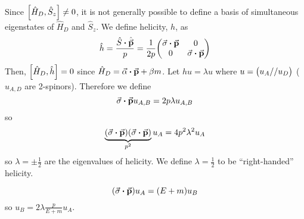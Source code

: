 \documentclass[a4paper,twoside,master.tex]{subfiles}
\begin{document}
Since $ \comm{\hat{H}_D}{\hat{S}_z} \neq 0 $, it is not generally possible to define a basis of simultaneous eigenstates of $ \hat{H}_D $ and $ \hat{S}_z $. We define helicity, $ h $, as
\begin{equation}
    \hat{h} = \frac{\hat{S} \vdot \hat{\va{p}}}{p} = \frac{1}{2p} \mqty(\va{\sigma} \vdot \va{p} & 0\\0 & \va{\sigma} \vdot \va{p})
\end{equation}
Then, $ \comm{\hat{H}_D}{\hat{h}} = 0 $ since $ \hat{H}_D = \va{\alpha} \vdot \va{p} + \beta m $. Let $ \hat{h} u = \lambda u $ where $ u = \mqty(u_A// u_D) $ ($ u_{A,D} $ are 2-spinors). Therefore we define
\begin{equation}
    \va{\sigma} \vdot \va{p} u_{A,B} = 2p \lambda u_{A,B}
\end{equation}
so
\begin{equation}
    \underbrace{(\va{\sigma} \vdot \va{p}) (\va{\sigma} \vdot \va{p})}_{p^2} u_A = 4 p^2 \lambda^2 u_A
\end{equation}
so $ \lambda = \pm \frac{1}{2} $ are the eigenvalues of helicity. We define $ \lambda = \frac{1}{2} $ to be ``right-handed'' helicity.


\begin{equation}
    (\va{\sigma} \vdot \va{p}) u_A = (E + m)u_B
\end{equation}
so $ u_B = 2 \lambda \frac{p}{E + m} u_A $.
\end{document}
